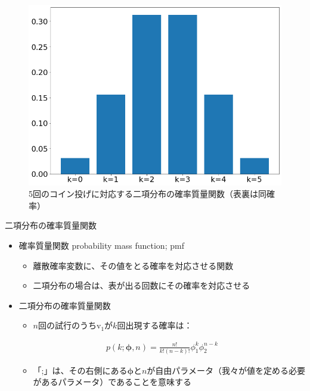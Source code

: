 \documentclass[aspectratio=169,unicode,dvipdfmx,14pt]{beamer}
\begin{document}
\begin{frame}
\begin{figure}[htbp]
\begin{center}
\vspace{.2in}
\includegraphics[scale=0.35]{binomial_bar.png}
\caption{5回のコイン投げに対応する二項分布の確率質量関数（表裏は同確率）}
\label{}
\end{center}
\end{figure}
\end{frame}


\begin{frame}{二項分布の確率質量関数}
\begin{itemize}
\item 確率質量関数 probability mass function; pmf
\begin{itemize}
\item 離散確率変数に、その値をとる確率を対応させる関数
\item 二項分布の場合は、表が出る回数にその確率を対応させる
\end{itemize}
\item 二項分布の確率質量関数
\begin{itemize}
\item $n$回の試行のうち$\mbox{v}_1$が$k$回出現する確率は：
\end{itemize}
\begin{align}
p(k;\bm{\phi},n)=\frac{n!}{k!(n-k)!}\phi_1^k\phi_2^{n-k}
\end{align}
\begin{itemize}
\item 「;」は、その右側にある$\bm{\phi}$と$n$が自由パラメータ（我々が値を定める必要があるパラメータ）であることを意味する
\end{itemize}
\end{itemize}
\end{frame}
\end{document}
